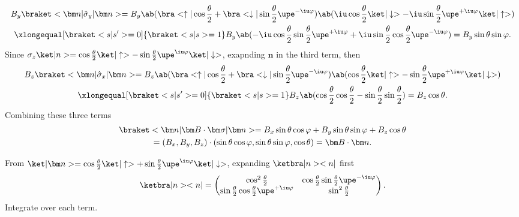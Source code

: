 \begin{solution}
\begin{enumext}
    \begin{multline*}
      B_y\braket<\bm n|\hat \sigma_y|\bm n>
    = B_y\ab(\bra<\uparrow|\cos\frac\theta2
        + \bra<\downarrow|\sin\frac\theta2 \upe^{-\iu\varphi})
          \ab(\iu\cos\frac\theta2\ket|\downarrow>
        - \iu\sin\frac\theta2 \upe^{+\iu\varphi} \ket|\uparrow>)\\
    \xlongequal[\braket<s|s'> = 0]{\braket<s|s> = 1} B_y \ab(
    - \iu \cos\frac\theta2 \sin\frac\theta2 \upe^{+\iu\varphi}
    + \iu \sin\frac\theta2 \cos\frac\theta2 \upe^{-\iu\varphi})
    = B_y \sin\theta \sin\varphi.
    \end{multline*}
    Since $\sigma_z\ket|n> = \cos\frac\theta2 \ket|\uparrow>
        - \sin\frac\theta2\upe^{\iu\varphi}\ket|\downarrow>$,
    exapnding $\bm n$ in the third term, then
    \begin{multline*}
      B_z\braket<\bm n|\hat \sigma_x|\bm n>
    = B_z\ab(\bra<\uparrow|\cos\frac\theta2
        + \bra<\downarrow|\sin\frac\theta2 \upe^{-\iu\varphi})
          \ab(\cos\frac\theta2\ket|\uparrow>
        - \sin\frac\theta2 \upe^{+\iu\varphi} \ket|\downarrow>)\\
    \xlongequal[\braket<s|s'> = 0]{\braket<s|s> = 1} B_z \ab(
      \cos\frac\theta2 \cos\frac\theta2
    - \sin\frac\theta2 \sin\frac\theta2)
    = B_z \cos\theta.
    \end{multline*}
    Combining these three terms
    \begin{multline*}
      \braket<\bm n|\bm B \cdot \bm\sigma|\bm n>
    = B_x \sin\theta \cos\varphi + B_y \sin\theta \sin\varphi + B_z \cos\theta\\
    = (B_x, B_y, B_z) \cdot
      (\sin\theta\cos\varphi, \sin\theta\sin\varphi, \cos\theta)
    = \bm B \cdot \bm n.
    \end{multline*}
    \item From $\ket|\bm n> = \cos\frac\theta2\ket|\uparrow>
    + \sin\frac\theta2\upe^{\iu\varphi} \ket|\downarrow>$,
    expanding $\ketbra|n><n|$ first
    \[
      \ketbra|n><n| =
      \begin{pmatrix}
        \cos^2\frac\theta2 &
        \cos\frac\theta2 \sin\frac\theta2 \upe^{-\iu\varphi}\\
        \sin\frac\theta2 \cos\frac\theta2 \upe^{+\iu\varphi} &
        \sin^2\frac\theta2
      \end{pmatrix}.
    \]
    Integrate over each term.
\end{enumext}
\end{solution}
